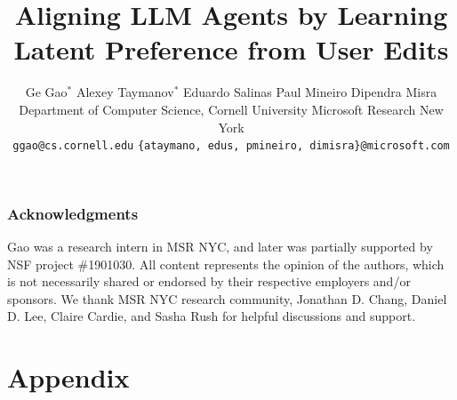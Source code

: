 \documentclass{article} %
\title{
Aligning LLM Agents by Learning Latent Preference from User Edits
}
\author{
Ge Gao\cn$^*$ \hspace{0.3em} Alexey Taymanov\msr$^*$  \hspace{0.3em} Eduardo Salinas\msr \hspace{0.3em}  Paul Mineiro\msr \hspace{0.3em} Dipendra Misra\msr  \\
\hspace{0.05em} Department of Computer Science, Cornell University\cn \hspace{1.1em} Microsoft Research New York\msr \\
\texttt{ggao@cs.cornell.edu}
\hspace{0.2em} \texttt{\{ataymano, edus, pmineiro, dimisra\}@microsoft.com}  
}
\begin{document}
\maketitle

\renewcommand*\thefootnote{\textbf{$*$}}
\renewcommand*{\thefootnote}{\arabic{footnote}}
\setcounter{footnote}{0}
















\subsubsection*{Acknowledgments}
Gao was a research intern in MSR NYC, and later was partially  supported by NSF project \#1901030. All content represents the opinion of the authors, which is not necessarily shared or endorsed by their respective employers and/or sponsors.
We thank MSR NYC research community, Jonathan D. Chang, Daniel D. Lee, Claire Cardie, and Sasha Rush for helpful discussions and support. 





\newpage
\appendix
\section*{{\Large Appendix}}





\end{document}
